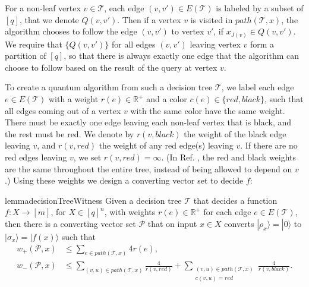 \documentclass[cleveref, autoref, thm-restate,11pt]{article}
\theoremstyle{definition}
\newcommand{\sop}[1]{{\mathcal #1}}
\newcommand{\ket}[1]{|#1\rangle}
\renewcommand{\wp}[2]{{w_+({#1},{#2})}}
\newcommand{\wm}[2]{{w_-({#1},{#2})}}
\begin{document}
For a non-leaf vertex $v\in \sop T$, each edge $(v,v')\in E(\sop T)$ is labeled by a subset of $[q]$, that we denote $Q(v,v')$. 
Then if a vertex $v$ is visited in $path(\sop T,x)$, the algorithm chooses to follow the edge $(v,v')$ to vertex $v'$, if $x_{J(v)}\in Q(v,v').$ We require that $\{Q(v,v')\}$ for all edges $(v,v')$ leaving vertex $v$ form a partition of $[q]$, so that there is always exactly one edge
that the algorithm can choose to follow based on the result of the 
query at vertex $v$. 


To create a quantum algorithm from such a decision tree $\sop T$, we label each edge 
$e\in E(\sop T)$ with a weight $r(e)\in \mathbb{R}^+$ and a color 
$c(e)\in\{red, black\}$, such that all edges 
coming out of a vertex $v$ with the same color have the same weight. 
There must be exactly one edge leaving each non-leaf vertex that is black,
and the rest must be red.
We denote by $r(v,black)$ the weight of the black
edge leaving $v$, and $r(v,red)$ the weight of any red edge(s) leaving $v$.
If there are no red edges leaving $v$, we set $r(v,red)=\infty.$ 
(In Ref. \cite{beigiQuantumSpeedupBased2019}, the red and black weights are the same
throughout the entire tree, instead of being allowed to depend on $v$.) 
Using these weights we design a converting vector set to decide $f$:
\begin{restatable}{lemma}{decisionTreeWitness}\label{lem:decision_tree_complexity} 
Given a decision tree $\sop T$ that decides a function $f:X\rightarrow [m]$,
for $X\in [q]^n$, with weights $r(e)\in \mathbb{R}^+$ for each edge $e\in E(\sop T)$,
then there is a converting vector set $\mathscr P$ that on input $x\in X$ converts 
$\ket{\rho_{x}}=\ket{0}$ to $\ket{\sigma_{x}}=\ket{f(x)}$ such that
\begin{align}
\wp{\mathscr P}{x}&\leq\sum_{e\in path(\sop T, x)}4r(e),\nonumber\\
\wm{\mathscr P}{x}&\leq \sum_{(v,u)\in path(\sop T,x)}\frac{4}{r(v,red)}
+\sum_{\substack{(v,u)\in path(\sop T,x)\\
c(v,u)=red}}\frac{4}{r(v,black)}.\label{eq:treeWitnesses}
\end{align}
\end{restatable}
\end{document}
